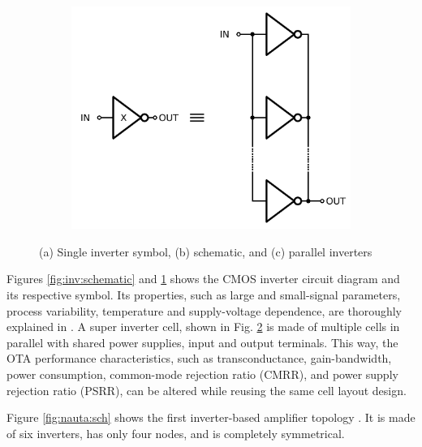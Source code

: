 \documentclass[conference]{IEEEtran}
\begin{document}
\begin{figure}[htbp]
\begin{subfigure}[b]{0.49\columnwidth}
			\caption{}
			\label{fig:inv:symbol}
		\end{subfigure}\\
		\begin{subfigure}[b]{0.49\columnwidth}
			\centerline{\includegraphics[scale=0.50]{circuits/inv_parallel.pdf}}
			\caption{}
			\label{fig:inv:parallel}
		\end{subfigure}
		
		\caption{(a) Single inverter symbol, (b) schematic, and (c) parallel inverters}
		\label{fig:inv:sch}
	\end{figure}
	
	Figures \ref{fig:inv:schematic} and  \ref{fig:inv:symbol} shows the CMOS inverter circuit diagram and its respective symbol. Its properties, such as large and small-signal parameters, process variability, temperature and supply-voltage dependence, are thoroughly explained in \cite{rodovalho2021push}. A super inverter cell, shown in Fig. \ref{fig:inv:parallel} is made of multiple cells in parallel with shared power supplies, input and output terminals. This way, the OTA performance characteristics, such as transconductance, gain-bandwidth, power consumption, common-mode rejection ratio (CMRR), and power supply rejection ratio (PSRR), can be altered while reusing the same cell layout design.
	
	Figure \ref{fig:nauta:sch} shows the first inverter-based amplifier topology \cite{nauta1992cmos}. It is made of six inverters, has only four nodes, and is completely symmetrical.
	
\end{document}
